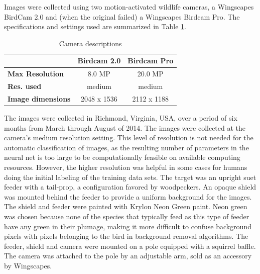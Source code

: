 \documentclass[11pt,twocolumn]{article}
\begin{document}
Images were collected using two motion-activated wildlife cameras, a Wingscapes BirdCam 2.0 and (when the original failed) a Wingscapes Birdcam Pro. The
specifications and settings used are summarized in Table \ref{table:cameras}.
\begin{table}[h]
  \caption{Camera descriptions}
  \label{table:cameras}
  \begin{center}
    \begin{tabular}{|l|c|c|}
      \hline
      & \bf{Birdcam 2.0} & \bf{Birdcam Pro} \\ \hline
      \bf{Max Resolution} & 8.0 MP & 20.0 MP \\ \hline
      \bf{Res. used} & medium & medium \\ \hline
      \bf{Image dimensions} & 2048 x 1536 & 2112 x 1188 \\ \hline
    \end{tabular}
  \end{center}
\end{table} 
The images were collected
in Richmond, Virginia, USA, over a period of six months from
March through August of 2014. The images
were collected at the camera's medium resolution setting. This level of
resolution is not needed for the automatic classification of images,
as the resulting number of parameters in the neural net is too large
to be computationally feasible on available computing resources.
However, the higher resolution was helpful in some cases for humans
doing the initial labeling of the training data sets.
The target was an upright suet feeder with a
tail-prop, a configuration favored by woodpeckers. An opaque shield
was mounted behind the feeder to provide a uniform background for the
images. The shield and feeder were painted with Krylon Neon Green paint.
Neon green was chosen because none of the species that typically feed
as this type of feeder have any green in their plumage, making it more
difficult to confuse background pixels with pixels belonging to the
bird in background removal algorithms. The feeder, shield and camera
were mounted on a pole equipped with a squirrel baffle. The camera was
attached to the pole by an adjustable arm, sold as an accessory by
Wingscapes.
\end{document}

